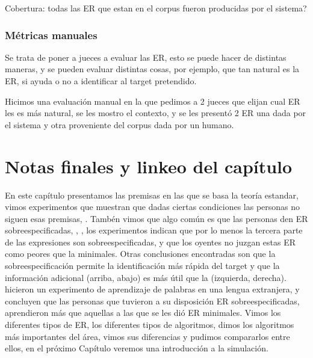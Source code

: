 Cobertura: todas las ER que estan en el corpus fueron producidas por el sistema?







\subsubsection{M\'etricas manuales}

Se trata de poner a jueces a evaluar las ER, esto se puede hacer de distintas maneras, y se pueden evaluar distintas cosas, por ejemplo, que tan natural es la ER, si ayuda o no a identificar al target pretendido. 

Hicimos una evaluaci\'on manual en la que pedimos a 2 jueces que elijan cual ER les es m\'as natural, se les mostro el contexto, y se les present\'o 2 ER una dada por el sistema y otra proveniente del corpus dada por un humano.


\section{Notas finales y linkeo del cap\'itulo}

En este cap\'itulo presentamos las premisas en las que se basa la teor\'ia estandar, vimos experimentos que muestran que dadas ciertas condiciones las personas no siguen esas premisas, \cite{keysar:Curr98}. Tamb\'en vimos que algo com\'un es que las personas den ER sobreespecificadas, \cite{arts}, \cite{do-speakers}, los experimentos indican que por lo menos la tercera parte de las expresiones son sobreespecificadas, y que los oyentes no juzgan estas ER como peores que la minimales. Otras conclusiones encontradas son que la sobreespecificaci\'on permite la identificaci\'on m\'as r\'apida del target y que la informaci\'on adicional (arriba, abajo) es m\'as \'util que la (izquierda, derecha). \cite{Lu_sasha2015} hicieron un experimento de aprendizaje de palabras en una lengua extranjera, y concluyen que las personas que tuvieron a su disposici\'on ER sobreespecificadas, aprendieron m\'as que aquellas a las que se les di\'o ER minimales.  Vimos los diferentes tipos de ER, los diferentes tipos de algoritmos, dimos los algoritmos m\'as importantes del \'area, vimos sus diferencias y pudimos compararlos entre ellos, en el pr\'oximo Cap\'itulo veremos una introducci\'on a la simulaci\'on.
